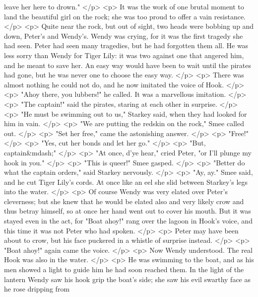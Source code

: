       leave her here to drown."
    </p>
    <p>
      It was the work of one brutal moment to land the beautiful girl on the
      rock; she was too proud to offer a vain resistance.
    </p>
    <p>
      Quite near the rock, but out of sight, two heads were bobbing up and down,
      Peter's and Wendy's. Wendy was crying, for it was the first tragedy she
      had seen. Peter had seen many tragedies, but he had forgotten them all. He
      was less sorry than Wendy for Tiger Lily: it was two against one that
      angered him, and he meant to save her. An easy way would have been to wait
      until the pirates had gone, but he was never one to choose the easy way.
    </p>
    <p>
      There was almost nothing he could not do, and he now imitated the voice of
      Hook.
    </p>
    <p>
      "Ahoy there, you lubbers!" he called. It was a marvellous imitation.
    </p>
    <p>
      "The captain!" said the pirates, staring at each other in surprise.
    </p>
    <p>
      "He must be swimming out to us," Starkey said, when they had looked for
      him in vain.
    </p>
    <p>
      "We are putting the redskin on the rock," Smee called out.
    </p>
    <p>
      "Set her free," came the astonishing answer.
    </p>
    <p>
      "Free!"
    </p>
    <p>
      "Yes, cut her bonds and let her go."
    </p>
    <p>
      "But, captain&mdash;"
    </p>
    <p>
      "At once, d'ye hear," cried Peter, "or I'll plunge my hook in you."
    </p>
    <p>
      "This is queer!" Smee gasped.
    </p>
    <p>
      "Better do what the captain orders," said Starkey nervously.
    </p>
    <p>
      "Ay, ay." Smee said, and he cut Tiger Lily's cords. At once like an eel
      she slid between Starkey's legs into the water.
    </p>
    <p>
      Of course Wendy was very elated over Peter's cleverness; but she knew that
      he would be elated also and very likely crow and thus betray himself, so
      at once her hand went out to cover his mouth. But it was stayed even in
      the act, for "Boat ahoy!" rang over the lagoon in Hook's voice, and this
      time it was not Peter who had spoken.
    </p>
    <p>
      Peter may have been about to crow, but his face puckered in a whistle of
      surprise instead.
    </p>
    <p>
      "Boat ahoy!" again came the voice.
    </p>
    <p>
      Now Wendy understood. The real Hook was also in the water.
    </p>
    <p>
      He was swimming to the boat, and as his men showed a light to guide him he
      had soon reached them. In the light of the lantern Wendy saw his hook grip
      the boat's side; she saw his evil swarthy face as he rose dripping from
